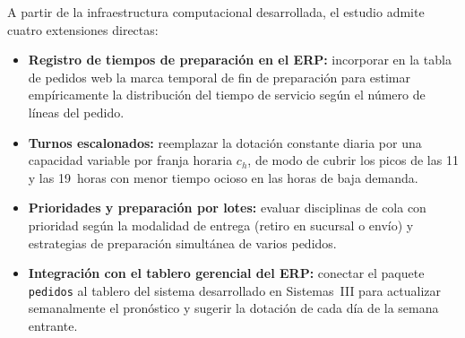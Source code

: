 A partir de la infraestructura computacional desarrollada, el estudio admite cuatro extensiones directas:
\begin{itemize}
  \item \textbf{Registro de tiempos de preparación en el ERP:} incorporar en la tabla de pedidos web la marca temporal de fin de preparación para estimar empíricamente la distribución del tiempo de servicio según el número de líneas del pedido.
  \item \textbf{Turnos escalonados:} reemplazar la dotación constante diaria por una capacidad variable por franja horaria $c_h$, de modo de cubrir los picos de las 11 y las 19~horas con menor tiempo ocioso en las horas de baja demanda.
  \item \textbf{Prioridades y preparación por lotes:} evaluar disciplinas de cola con prioridad según la modalidad de entrega (retiro en sucursal o envío) y estrategias de preparación simultánea de varios pedidos.
  \item \textbf{Integración con el tablero gerencial del ERP:} conectar el paquete \texttt{pedidos} al tablero del sistema desarrollado en Sistemas~III para actualizar semanalmente el pronóstico y sugerir la dotación de cada día de la semana entrante.
\end{itemize}
